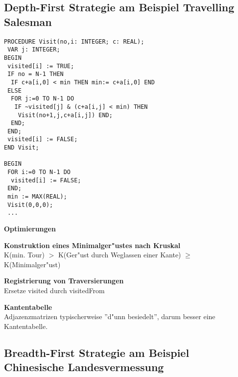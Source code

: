 \documentclass[10pt, a4paper, twocolumn]{scrartcl}
\begin{document}
\subsection{Depth-First Strategie am Beispiel Travelling Salesman}

\begin{verbatim}
PROCEDURE Visit(no,i: INTEGER; c: REAL);
 VAR j: INTEGER;
BEGIN
 visited[i] := TRUE;
 IF no = N-1 THEN
  IF c+a[i,0] < min THEN min:= c+a[i,0] END
 ELSE
  FOR j:=0 TO N-1 DO
   IF ~visited[j] & (c+a[i,j] < min) THEN 
    Visit(no+1,j,c+a[i,j]) END;
  END;
 END;
 visited[i] := FALSE;
END Visit;

BEGIN
 FOR i:=0 TO N-1 DO
  visited[i] := FALSE;
 END;
 min := MAX(REAL);
 Visit(0,0,0);
 ...
\end{verbatim}

{\bf Optimierungen}\\
\begin{description}
 \item {\bf Konstruktion eines Minimalger"ustes nach Kruskal}\\
 K(min. Tour) $>$ K(Ger"ust durch Weglassen einer Kante) $\geq$ K(Minimalger"ust)
 \item {\bf Registrierung von Traversierungen}\\
 Ersetze visited durch visitedFrom
 \item {\bf Kantentabelle}\\
 Adjazenzmatrizen typischerweise ''d"unn besiedelt'', darum besser eine Kantentabelle.
\end{description}

\subsection{Breadth-First Strategie am Beispiel Chinesische Landesvermessung}
\end{document}
